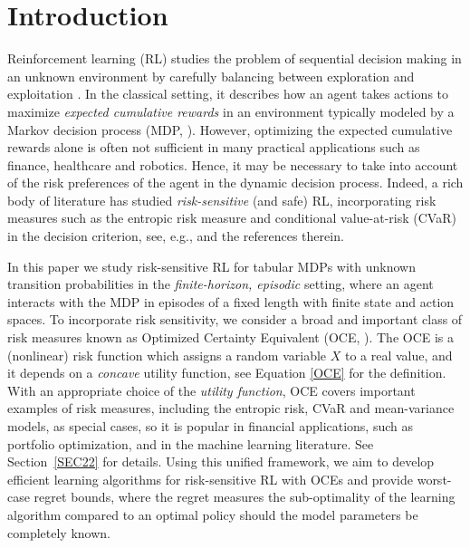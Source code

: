 \documentclass[11pt]{article}
\newcommand{\1}{\mathbbm{1}}
\begin{document}
\section{Introduction}
Reinforcement learning (RL) studies the problem of sequential decision making in an unknown environment by carefully balancing between exploration and exploitation \citep{sutton2018reinforcement}. In the classical setting, it describes how an agent takes actions to maximize
\textit{expected cumulative rewards} in an environment typically modeled by a Markov decision
process (MDP, \cite{puterman2014markov}). %
However, 
optimizing the expected cumulative rewards alone is often not sufficient in many practical applications such as finance, healthcare and robotics.  Hence, it may be necessary to take into account of the risk preferences of the agent in the dynamic decision process. Indeed, a rich body of literature has studied \textit{risk-sensitive} (and safe) RL, incorporating risk measures such as the entropic risk measure and conditional value-at-risk (CVaR) in the decision criterion, see, e.g., \cite{shen2014risk, garcia2015comprehensive, tamar2016learning,chow2017risk, prashanth2018risk, fei2020risk} and the references therein. 





In this paper we study risk-sensitive RL for tabular MDPs with unknown transition probabilities
in the \textit{finite-horizon, episodic} setting, where an agent interacts with the MDP in episodes of a fixed length with finite state and action spaces. 
To incorporate risk sensitivity, we consider a broad and important class of risk measures known as Optimized Certainty Equivalent (OCE, \citep{ben1986expected, ben2007old}). The OCE is a (nonlinear) risk function which assigns a random variable $X$ to a real value, and it depends on a \textit{concave} utility function, see Equation \eqref{OCE} for the definition. 
With an appropriate choice of the \textit{utility function}, OCE covers important examples of risk measures, including the entropic risk, CVaR and mean-variance models, as special cases, so it is popular in financial applications, such as portfolio optimization, and in the machine learning literature. See Section~\ref{SEC22} for details. Using this unified framework, we aim to develop efficient learning algorithms for risk-sensitive RL with OCEs and provide worst-case regret bounds, where the regret measures the sub-optimality of the learning algorithm compared to an optimal policy should the model parameters be completely known. 
\end{document}
